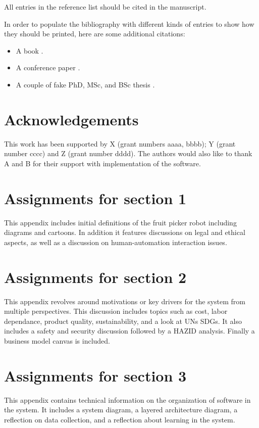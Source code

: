 \documentclass{modelica}
\begin{document}
All entries in the reference list should be cited in the manuscript.

In order to populate the bibliography with different kinds of entries to show how they should be printed, here are some additional citations:

\begin{itemize}
\item A book \cite{Kernighan:1988}.
\item A conference paper \cite{colaco:2003}.
\item A couple of fake PhD, MSc, and BSc thesis \cite{Doe:PhD,Doe:MSc,Doe:BSc}.
\end{itemize}

\section*{Acknowledgements}

This work has been supported by X (grant numbers aaaa, bbbb); Y (grant number cccc) and Z (grant number dddd).
The authors would also like to thank A and B for their support with implementation of the software.

\printbibliography

\newpage
\onecolumn
\appendix
\section[Section 1]{Assignments for section 1}
\label{paper-w1}
This appendix includes initial definitions of the fruit picker robot including diagrams and cartoons. In addition it features discussions on legal and ethical aspects, as well as a discussion on human-automation interaction issues.

\section[Section 1]{Assignments for section 2}
\label{paper-w2}
This appendix revolves around motivations or key drivers for the system from multiple perspectives. This discussion includes topics such as cost, labor dependance, product quality, sustainability, and a look at UNs SDGs. It also includes a safety and security discussion followed by a HAZID analysis. Finally a business model canvas is included.

\section[Section 1]{Assignments for section 3}
\label{paper-w3}
This appendix contains technical information on the organization of software in the system. It includes a system diagram, a layered architecture diagram, a reflection on data collection, and a reflection about learning in the system. 

\end{document}
